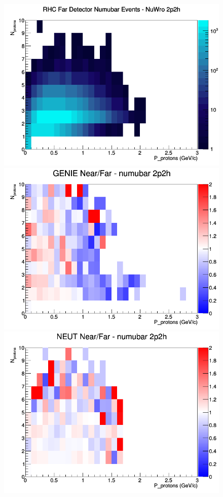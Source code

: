 \begin{figure}[h]
\endminipage
{}
\includegraphics[width=\linewidth]{N_P/nominal/protons/2p2h_RHC_FD_numubar_N_P_NuWro.png}
\endminipage
\newline
{}
\includegraphics[width=\linewidth]{N_P/nominal/protons/ratios/2p2h_GENIE_numubar_NF_N_P.png}
\endminipage
{}
\includegraphics[width=\linewidth]{N_P/nominal/protons/ratios/2p2h_NEUT_numubar_NF_N_P.png}

\end{figure}
